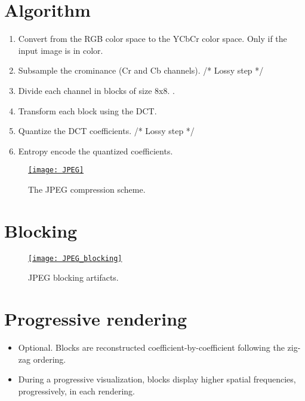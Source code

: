 \section{Algorithm}
\begin{enumerate}
\item Convert from the \gls{RGB} color space to the \gls{YCbCr} color
  space. Only if the input image is in color.
\item Subsample the crominance (Cr and Cb channels). /* Lossy step */
\item Divide each channel in blocks of size 8x8. .
\item Transform each block using the \gls{DCT}.
\item Quantize the \gls{DCT} coefficients. /* Lossy step */
\item Entropy encode the quantized coefficients.
\end{enumerate}

\begin{figure}[H]
  \vspace{-2ex}
  \centering
  \href{https://link.springer.com/article/10.1007/s40799-019-00358-4}{\texttt{[image: JPEG]}}
  \caption{The \gls{JPEG} compression scheme.}
  \label{fig:JPEG_compressor}
\end{figure}

\section{Blocking}
\begin{figure}[H]
  \vspace{-2ex}
  \centering
  \href{https://thesai.org/Publications/ViewPaper?Volume=6&Issue=4&Code=ijacsa&SerialNo=16}{\texttt{[image: JPEG\_blocking]}}
  \caption{\gls{JPEG} blocking artifacts.}
  \label{fig:JPEG_blocking}
\end{figure}

\section{Progressive rendering}
\begin{itemize}
\item Optional. Blocks are reconstructed coefficient-by-coefficient following the zig-zag ordering.
\item During a progressive visualization, blocks display higher
  spatial frequencies, progressively, in each rendering.
\end{itemize}

